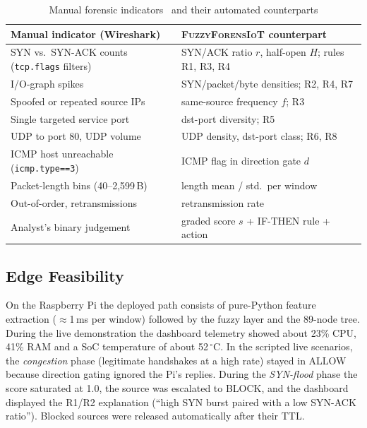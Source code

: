 \documentclass[conference]{IEEEtran}
\newcommand{\fname}{\textsc{FuzzyForensIoT}}
\begin{document}
\begin{table}[t]
\centering
\caption{Manual forensic indicators~\cite{naing2023,khaing2020} and their automated counterparts}
\label{tab:mapping}
\footnotesize
\renewcommand{\arraystretch}{1.1}
\setlength{\tabcolsep}{3pt}
\begin{tabular}{@{}>{\raggedright\arraybackslash}p{3.3cm} >{\raggedright\arraybackslash}p{4.7cm}@{}}
\toprule
\textbf{Manual indicator (Wireshark)} & \textbf{\fname{} counterpart} \\
\midrule
SYN vs.\ SYN-ACK counts (\texttt{tcp.flags} filters) & SYN/ACK ratio $r$, half-open $H$; rules R1, R3, R4 \\
I/O-graph spikes & SYN/packet/byte densities; R2, R4, R7 \\
Spoofed or repeated source IPs & same-source frequency $f$; R3 \\
Single targeted service port & dst-port diversity; R5 \\
UDP to port 80, UDP volume & UDP density, dst-port class; R6, R8 \\
ICMP host unreachable (\texttt{icmp.type==3}) & ICMP flag in direction gate $d$ \\
Packet-length bins (40--2,599\,B) & length mean / std.\ per window \\
Out-of-order, retransmissions & retransmission rate \\
Analyst's binary judgement & graded score $s$ + IF-THEN rule + action \\
\bottomrule
\end{tabular}
\end{table}

\subsection{Edge Feasibility}
On the Raspberry Pi the deployed path consists of pure-Python feature extraction ($\approx$1\,ms per window) followed by the fuzzy layer and the 89-node tree. During the live demonstration the dashboard telemetry showed about 23\% CPU, 41\% RAM and a SoC temperature of about 52\,$^\circ$C. In the scripted live scenarios, the \emph{congestion} phase (legitimate handshakes at a high rate) stayed in ALLOW because direction gating ignored the Pi's replies. During the \emph{SYN-flood} phase the score saturated at 1.0, the source was escalated to BLOCK, and the dashboard displayed the R1/R2 explanation (``high SYN burst paired with a low SYN-ACK ratio''). Blocked sources were released automatically after their TTL.
\end{document}
